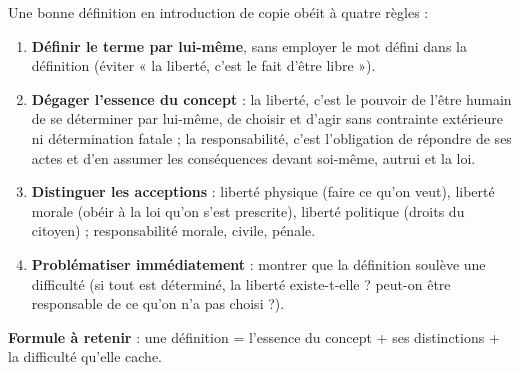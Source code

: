 \documentclass[11pt]{article}
\newcommand{\cle}[1]{{\popxbold\color{popdark}#1}}
\begin{document}
\begin{methode}
Une bonne définition en introduction de copie obéit à quatre règles :
\begin{enumerate}
\item \textbf{Définir le terme par lui-même}, sans employer le mot défini dans la définition (éviter « la liberté, c'est le fait d'être libre »).
\item \textbf{Dégager l'essence du concept} : la \cle{liberté}, c'est le pouvoir de l'être humain de se déterminer par lui-même, de choisir et d'agir sans contrainte extérieure ni détermination fatale ; la \cle{responsabilité}, c'est l'obligation de répondre de ses actes et d'en assumer les conséquences devant soi-même, autrui et la loi.
\item \textbf{Distinguer les acceptions} : liberté physique (faire ce qu'on veut), liberté morale (obéir à la loi qu'on s'est prescrite), liberté politique (droits du citoyen) ; responsabilité morale, civile, pénale.
\item \textbf{Problématiser immédiatement} : montrer que la définition soulève une difficulté (si tout est déterminé, la liberté existe-t-elle ? peut-on être responsable de ce qu'on n'a pas choisi ?).
\end{enumerate}
\textbf{Formule à retenir} : une définition = l'essence du concept + ses distinctions + la difficulté qu'elle cache.
\end{methode}
\end{document}
